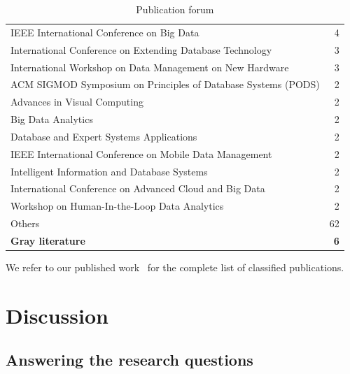 \begin{table}[hptb]
\begin{tabularx}{\textwidth}{X r}
      \hspace{0.5em} IEEE International Conference on Big Data & 4 \\
      \hspace{0.5em} International Conference on Extending Database Technology & 3 \\
      \hspace{0.5em} International Workshop on Data Management on New Hardware & 3 \\
      \hspace{0.5em} ACM SIGMOD Symposium on Principles of Database Systems (PODS) & 2 \\
      \hspace{0.5em} Advances in Visual Computing & 2 \\
      \hspace{0.5em} Big Data Analytics & 2 \\
      \hspace{0.5em} Database and Expert Systems Applications & 2 \\
      \hspace{0.5em} IEEE International Conference on Mobile Data Management & 2 \\
      \hspace{0.5em} Intelligent Information and Database Systems & 2 \\
      \hspace{0.5em} International Conference on Advanced Cloud and Big Data & 2 \\
      \hspace{0.5em} Workshop on Human-In-the-Loop Data Analytics & 2 \\
      \hspace{0.5em} Others & 62 \\
    \textbf{Gray literature} & \textbf{6}
  \end{tabularx}
  \caption{Publication forum}\label{tab:mapping/publication}
\end{table}

We refer to our published work~\cite{Alvarez2019} for the complete list of classified publications.

\section{Discussion}
\label{sec:mapping/discussion}

\subsection{Answering the research questions}


